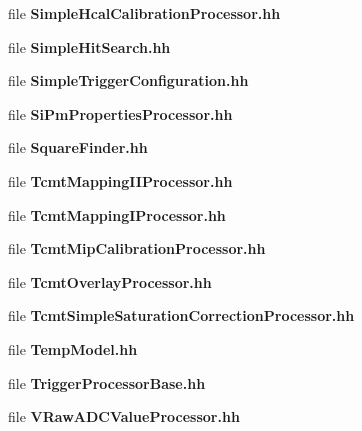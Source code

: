 \begin{DoxyCompactItemize}
\item 
file {\bfseries Simple\-Hcal\-Calibration\-Processor.\-hh}
\item 
file {\bfseries Simple\-Hit\-Search.\-hh}
\item 
file {\bfseries Simple\-Trigger\-Configuration.\-hh}
\item 
file {\bfseries Si\-Pm\-Properties\-Processor.\-hh}
\item 
file {\bfseries Square\-Finder.\-hh}
\item 
file {\bfseries Tcmt\-Mapping\-I\-I\-Processor.\-hh}
\item 
file {\bfseries Tcmt\-Mapping\-I\-Processor.\-hh}
\item 
file {\bfseries Tcmt\-Mip\-Calibration\-Processor.\-hh}
\item 
file {\bfseries Tcmt\-Overlay\-Processor.\-hh}
\item 
file {\bfseries Tcmt\-Simple\-Saturation\-Correction\-Processor.\-hh}
\item 
file {\bfseries Temp\-Model.\-hh}
\item 
file {\bfseries Trigger\-Processor\-Base.\-hh}
\item 
file {\bfseries V\-Raw\-A\-D\-C\-Value\-Processor.\-hh}
\end{DoxyCompactItemize}
